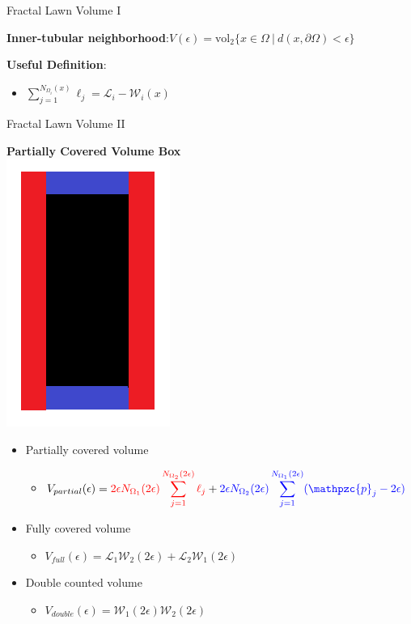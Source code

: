 \documentclass{if-beamer}
\newcommand{\SL}{\mathcal{L}}
\newcommand{\Om}{\Omega}
\newcommand{\W}{\mathcal{W}}
\newcommand{\p}{\mathpzc{p}}
\begin{document}
\begin{frame}{Fractal Lawn Volume I}

{\bf Inner-tubular neighborhood}:\quad $V(\epsilon) = \text{vol}_2\{x \in \Om\ |\ d(x,\partial\Om) < \epsilon\}$
\pause
\vspace{0.2in}

{\bf Useful Definition}:
\begin{itemize}
	\item $\displaystyle \sum_{j = 1}^{N_{\Om_i}(x)}\ell_j=\SL_i - \W_i(x)$
\end{itemize}

\end{frame}


\begin{frame}{Fractal Lawn Volume II}
	\begin{center}
		{\bf Partially Covered Volume Box} \\
		\includegraphics[scale=0.25]{VolumeBox.png}
	\end{center}
	\pause
	\vspace{0.2in}
	
	\begin{itemize}
		\item Partially covered volume
		\begin{itemize}
			\item $\displaystyle V_{partial}(\epsilon)=\textcolor{red}{2\epsilon N_{\Om_1}(2\epsilon)\sum_{j=1}^{N_{\Om_2}(2\epsilon)} \ell_j} + \textcolor{blue}{2\epsilon N_{\Om_2}(2\epsilon)\sum_{j=1}^{N_{\Om_1}(2\epsilon)} (\p_j - 2\epsilon)}$
		\end{itemize}
		\pause
		
		\item Fully covered volume
		\begin{itemize}
			\item $\displaystyle V_{full}(\epsilon)=\SL_1 \W_2(2\epsilon) + \SL_2 \W_1(2\epsilon)$
		\end{itemize}
		\pause
		
		\item Double counted volume
		\begin{itemize}
			\item $V_{double}(\epsilon)=\W_1(2\epsilon) \W_2(2\epsilon)$
		\end{itemize}
	\end{itemize}
	
\end{frame}
\end{document}
